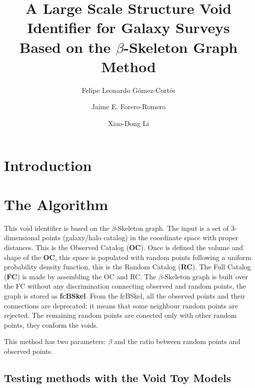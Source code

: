 \documentclass[preprint]{aastex62}
\begin{document}
\title{A Large Scale Structure Void Identifier for Galaxy Surveys Based on the 
$\beta$-Skeleton Graph Method}


\author{Felipe Leonardo Gómez-Cortés}

\author{Jaime E. Forero-Romero}

\author{Xiao-Dong Li}


\begin{abstract}

\end{abstract}


\section{Introduction}


\section{The Algorithm}

This void identifier is based on the $\beta$-Skeleton graph. The input is a
set of 3-dimensional points (galaxy/halo catalog) in the coordinate space with
proper distances. This is the Observed Catalog (\textbf{OC}). Once is defined
the volume and shape of the \textbf{OC}, this space is populated with random
points following a uniform probability density function, this is the Random
Catalog (\textbf{RC}). The Full Catalog (\textbf{FC}) is made by assembling
the OC and RC. The $\beta$-Skeleton graph is built over the FC without any
discrimination connecting observed and random points, the graph is stored as
\textbf{fcBSkel}. From the fcBSkel, all the observed points and their
connections are deprecated; it means that some neighbour random points are
rejected. The remaining random points are conected only with other random
points, they conform the voids.

This method has two parameters: $\beta$ and the ratio between random
points and observed points.


\subsection{Testing methods with the Void Toy Models}
\end{document}
